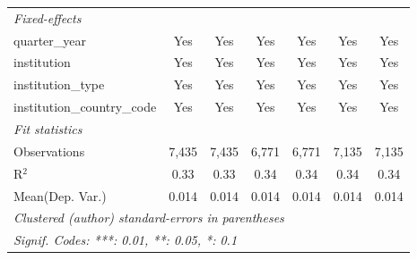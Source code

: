 \begin{tabular}{lcccccc}
   \emph{Fixed-effects}\\
   quarter\_year                      & Yes     & Yes      & Yes     & Yes      & Yes     & Yes\\  
   institution                        & Yes     & Yes      & Yes     & Yes      & Yes     & Yes\\  
   institution\_type                  & Yes     & Yes      & Yes     & Yes      & Yes     & Yes\\  
   institution\_country\_code         & Yes     & Yes      & Yes     & Yes      & Yes     & Yes\\  
   \midrule
   \emph{Fit statistics}\\
   Observations                       & 7,435   & 7,435    & 6,771   & 6,771    & 7,135   & 7,135\\  
   R$^2$                              & 0.33    & 0.33     & 0.34    & 0.34     & 0.34    & 0.34\\  
Mean(Dep. Var.) & 0.014 & 0.014 & 0.014 & 0.014 & 0.014 & 0.014 \\
   \midrule \midrule
   \multicolumn{7}{l}{\emph{Clustered (author) standard-errors in parentheses}}\\
   \multicolumn{7}{l}{\emph{Signif. Codes: ***: 0.01, **: 0.05, *: 0.1}}\\
\end{tabular}
\par\endgroup
